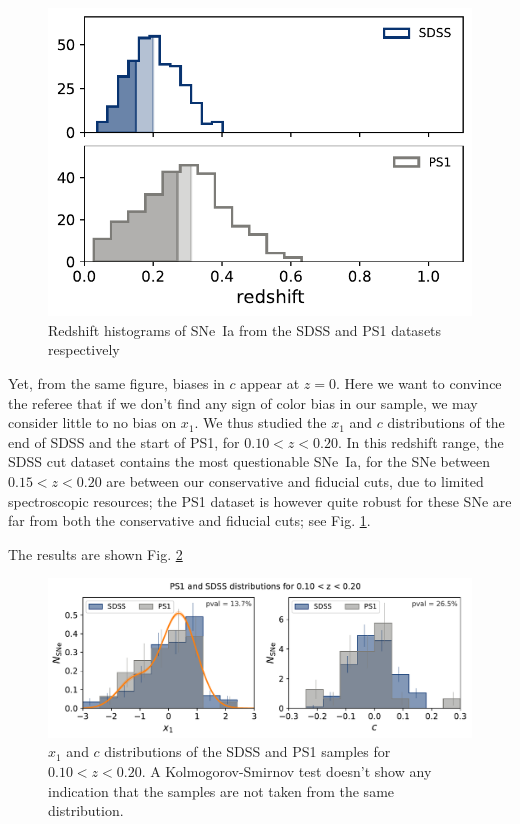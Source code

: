 \documentclass[11pt,a4paper]{paper}
\begin{document}
\begin{figure}
    \vspace*{-20pt}
    \centering
    \includegraphics[width=\linewidth]{Answer_figures/hist_surveys2_btw_cividis.pdf}
    \captionsetup{justification=centering}
    \caption{\small Redshift histograms of SNe~Ia from the SDSS and PS1 datasets
    respectively}
    \label{fig:hists}
\end{figure}
Yet, from the same figure, biases in $c$ appear at $z=0$. Here we want to
convince the referee that if we don't find any sign of color bias in our sample,
we may consider little to no bias on $x_1$. We thus studied the $x_1$ and $c$
distributions of the end of SDSS and the start of PS1, for $0.10 < z < 0.20$. In
this redshift range, the SDSS cut dataset contains the most questionable SNe~Ia,
for the SNe between $0.15 < z < 0.20$ are between our conservative and fiducial
cuts, due to limited spectroscopic resources; the PS1 dataset is however quite
robust for these SNe are far from both the conservative and fiducial cuts; see
Fig. \ref{fig:hists}. \bigbreak

The results are shown Fig. \ref{fig:distrib}

\begin{figure}[htbp!]
    \centering
    \includegraphics[width=\linewidth]{Answer_figures/both-cut_SDSS_PS1-010-020.pdf}
    \captionsetup{justification=centering}
    \caption{$x_1$ and $c$ distributions of the SDSS and PS1 samples for $0.10 <
    z < 0.20$. A Kolmogorov-Smirnov test doesn't show any indication that the
samples are not taken from the same distribution.}
\label{fig:distrib}
\end{figure}
\end{document}
